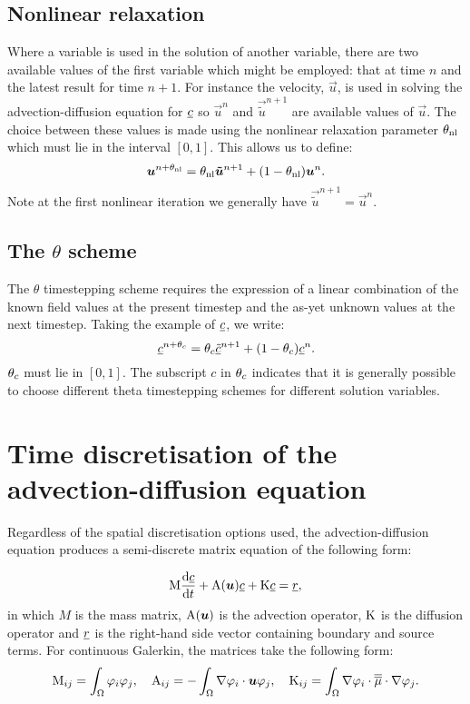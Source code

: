 \subsection{Nonlinear relaxation}\label{sect:relax}

Where a variable is used in the solution of another variable, there are two
available values of the first variable which might be employed: that at time
$n$ and the latest result for time $n+1$. For instance the velocity,
$\vec u$, is used in solving the advection-diffusion equation for
$\underline{c}$ so $\vec{u}^n$ and $\vec{\tilde u}^{n+1}$ are available values
of $\vec u$. The choice between these values is made using the
nonlinear relaxation parameter $\theta_{\mathrm{nl}}$ which must lie in the interval
$[0,1]$. This allows us to define:
\begin{equation}
  \label{eq:thetanl}
  {\mbox{\boldmath$u$}}^{n+\theta_{\mathrm{nl}}}=\theta_{\mathrm{nl}}{\mbox{\boldmath$\tilde u$}}^{n+1} + (1-\theta_{\mathrm{nl}}){\mbox{\boldmath$u$}}^n.
\end{equation}
Note at the first nonlinear iteration we generally have $\vec{\tilde u}^{n+1} = \vec{u}^n$.

\subsection{The $\theta$ scheme}
\label{sect:ND_time_theta_scheme}

The $\theta$ timestepping scheme requires the expression of a linear
combination of the known field values at the present timestep and the as-yet
unknown values at the next timestep. Taking the example of $\underline{c}$, we write:
\begin{equation}
  \label{eq:thetac}
  \underline{c}^{n+\theta_c}=\theta_c\underline{\tilde c}^{n+1}+(1-\theta_c)\underline{c}^{n}.
\end{equation}
$\theta_c$ must lie in $[0,1]$. The subscript $c$ in $\theta_c$ indicates that it is 
generally possible to choose different theta timestepping schemes for different solution
variables.

\section{Time discretisation of the advection-diffusion equation}
\label{sect:ND_time_disct_adv_diff}

Regardless of the spatial discretisation options used, the
advection-diffusion equation produces a semi-discrete matrix equation of the
following form:

\begin{equation}
  \mathrm{M} \frac{\mathrm{d}\underline{c}}{\mathrm{d} t}+\mathrm{A}({\mbox{\boldmath$u$}})\underline{c}+\mathrm{K}\underline{c}=\underline{r},
\end{equation}
in which $M$ is the mass matrix, $\mathrm{A}({\mbox{\boldmath$u$}})$ is the advection
operator, $\mathrm{K}$ is the diffusion operator and $\underline{r}$ is the
right-hand side vector containing boundary and source terms. For continuous
Galerkin, the matrices take the following form:
\begin{equation}
  \mathrm{M}_{ij}=\int_\Omega \varphi_i\varphi_j, \quad
  \mathrm{A}_{ij}=-\int_\Omega \nabla\varphi_i\cdot{\mbox{\boldmath$u$}} \varphi_j, \quad
  \mathrm{K}_{ij}=\int_\Omega \nabla\varphi_i\cdot \overline{\overline{\mu}}\cdot\nabla \varphi_j.
\end{equation}

